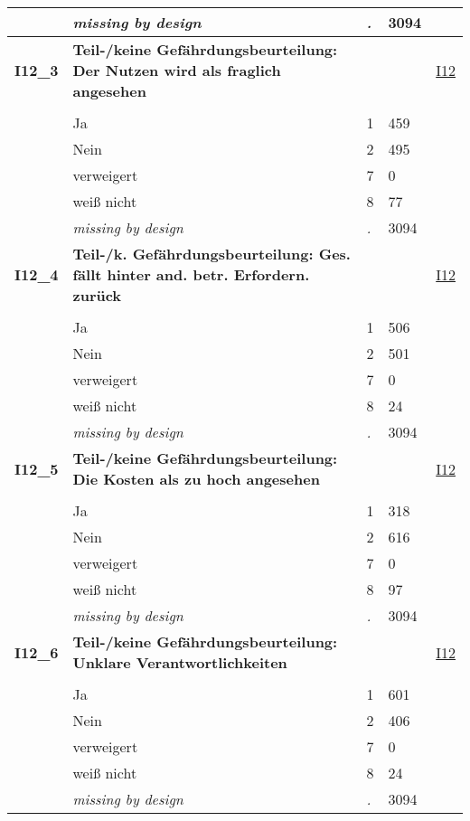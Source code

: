 \begin{longtable}{| L{2.65cm} | L{8cm} | C{1.5cm} | R{1.25cm} | C{2.25cm}  |}
   & \textit{missing by design} & \textit{.} & 3094 &  \\ 
   \midrule
\textbf{I12\_3}\label{var:I12:3} & \textbf{Teil-/keine Gefährdungsbeurteilung: Der Nutzen wird als fraglich angesehen} &  &  & \hyperref[I12]{I12} \\ 
   &  &  &  &  \\ 
   & Ja & 1 & 459 &  \\ 
   & Nein & 2 & 495 &  \\ 
   & verweigert & 7 & 0 &  \\ 
   & weiß nicht & 8 & 77 &  \\ 
   & \textit{missing by design} & \textit{.} & 3094 &  \\ 
   \midrule
\textbf{I12\_4}\label{var:I12:4} & \textbf{Teil-/k. Gefährdungsbeurteilung: Ges. fällt hinter and. betr. Erfordern. zurück} &  &  & \hyperref[I12]{I12} \\ 
   &  &  &  &  \\ 
   & Ja & 1 & 506 &  \\ 
   & Nein & 2 & 501 &  \\ 
   & verweigert & 7 & 0 &  \\ 
   & weiß nicht & 8 & 24 &  \\ 
   & \textit{missing by design} & \textit{.} & 3094 &  \\ 
   \midrule
\textbf{I12\_5}\label{var:I12:5} & \textbf{Teil-/keine Gefährdungsbeurteilung: Die Kosten als zu hoch angesehen} &  &  & \hyperref[I12]{I12} \\ 
   &  &  &  &  \\ 
   & Ja & 1 & 318 &  \\ 
   & Nein & 2 & 616 &  \\ 
   & verweigert & 7 & 0 &  \\ 
   & weiß nicht & 8 & 97 &  \\ 
   & \textit{missing by design} & \textit{.} & 3094 &  \\ 
   \midrule
\textbf{I12\_6}\label{var:I12:6} & \textbf{Teil-/keine Gefährdungsbeurteilung: Unklare Verantwortlichkeiten} &  &  & \hyperref[I12]{I12} \\ 
   &  &  &  &  \\ 
   & Ja & 1 & 601 &  \\ 
   & Nein & 2 & 406 &  \\ 
   & verweigert & 7 & 0 &  \\ 
   & weiß nicht & 8 & 24 &  \\ 
   & \textit{missing by design} & \textit{.} & 3094 &  \\ 

\end{longtable}
